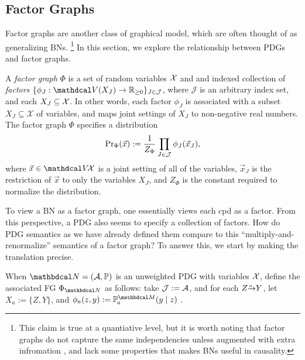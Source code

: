 \subsection{Factor Graphs} 
    \label{sec:factor-graphs}
Factor graphs 
\citep{kschischang2001sumproduct}
are another class of graphical model, which are often thought of as generalizing BNs.%
    \footnote{This claim is true at a quantiative level, but it is worth noting that factor graphs do not capture the same independencies unless augmented with extra infromation \citep{frey2012extending}, and lack some properties that makes BNs useful in causality.}
In this section, we explore the relationship between PDGs and factor graphs.

\begin{defn}
 A \emph{factor graph} $\Phi$ is a set of random variables
        $\mathcal X$ and
    and indexed collection of \emph{factors}
       $\{\phi_J : \V(X_J) \to \mathbb R_{\geq0}\}_{J \in
\mathcal J }$,
where $\mathcal J$ is an arbitrary index set, 
and each $X_J \subseteq \mathcal X$.  
In other words, each factor $\phi_J$ is associated with a subset
$X_J\subseteq \mathcal{X}$ of variables, and maps
joint settings of $X_J$ to non-negative real numbers.
The factor graph $\Phi$ specifies a distribution
\[ {\Pr}_{\Phi}(\vec x) := \frac{1}{Z_{\Phi}}
 	\prod_{J \in \cal J} \phi_J(\vec x_J), \]
where $\vec{x} \in \V\!\X$ is a joint setting of all of the variables,
 $\vec{x}_J$ is the restriction of $\vec{x}$ to only the
 variables $X_J$, and $Z_{\Phi}$ is the constant required to
 normalize the distribution.  
\end{defn}

To view a BN as a factor graph, one essentially views each cpd as a factor.
From this perspective, a PDG also seems to specify a collection of factors. 
How do PDG semantics as we have already defined them compare to this 
``multiply-and-renormalize'' semantics of a factor graph?
To answer this, we start by making the translation precise.

\begin{defn}\label{def:PDG2fg}
When $\dg N = (\Ar, \mathbb P)$ is an unweighted PDG with variables $\mathcal X$, 
define the associated FG $\FGof{\dg N}$ as follows:
take $\mathcal J := \mathcal A$, 
and for each $\ed aZY$, let $X_{a} := \{Z,Y\}$, and $\phi_a(z,y) := \p_a^{\dg M}(y \mid z)$ 
\unskip.
\end{defn}


